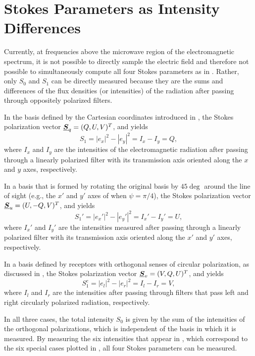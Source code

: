 \section{Stokes Parameters as Intensity Differences}
\label{app:Stokes_via_intensity_differences}

Currently, at frequencies above the microwave region of the electromagnetic spectrum, it is not possible to directly sample the electric field and therefore not possible to simultaneously compute all four Stokes parameters as in .
%
Rather, only $S_0$ and $S_1$ can be directly measured because they are the sums and differences of the flux densities (or intensities) of the radiation after passing through oppositely polarized filters.

In the basis defined by the Cartesian coordinates introduced in , the Stokes polarization vector $\underline{\mbox{\boldmath $S$}}_q=(Q,U,V)^T$, and  yields
%
\begin{equation}
\label{eqn:Q_intensity}
	S_1 = \left| e_x \right|^2 -  \left| e_y \right|^2 = I_x - I_y = Q,
\end{equation}
%
where $I_x$ and $I_y$ are the intensities of the electromagnetic radiation after passing through a linearly polarized filter with its transmission axis oriented along the $x$ and $y$ axes, respectively.

In a basis that is formed by rotating the original basis by $45\deg$ around the line of sight
(e.g.,  the $x'$ and $y'$ axes of  when $\psi=\pi/4$),
%
the Stokes polarization vector $\underline{\mbox{\boldmath $S$}}_u=(U,-Q,V)^T$, and  yields
%
\begin{equation}
\label{eqn:U_intensity}
	S_1' = \left| e_x' \right|^2 -  \left| e_y' \right|^2 = I_x' - I_y' = U,
\end{equation}
%
where $I_x'$ and $I_y'$ are the intensities measured after passing through a linearly polarized filter with its transmission axis oriented along the $x'$ and $y'$ axes, respectively.


In a basis defined by receptors with orthogonal senses of circular
polarization, as discussed in , the Stokes polarization vector $\underline{\mbox{\boldmath $S$}}_v=(V,Q,U)^T$, 
and  yields
%
\begin{equation}
\label{eqn:V_intensity}
	S_1^c = \left| e_l \right|^2 -  \left| e_r \right|^2 = I_l - I_r = V,
\end{equation}
where $I_l$ and $I_r$ are the intensities after passing through filters that pass left and right circularly polarized radiation, respectively.

In all three cases, the total intensity $S_0$ is given by the sum of the intensities of the orthogonal polarizations, which is independent of the basis in which it is measured.  By measuring the six intensities that appear in , which correspond to the six special cases plotted in , all four Stokes parameters can be measured.

